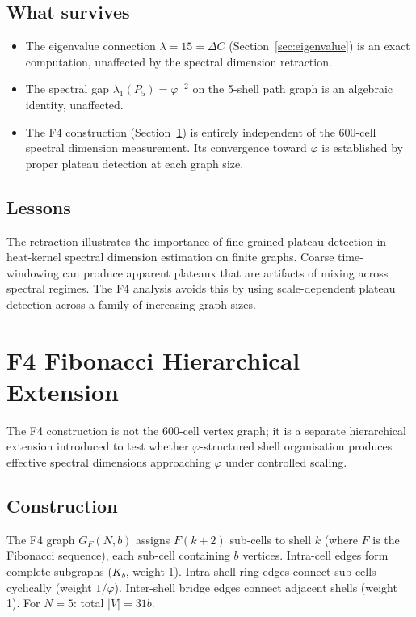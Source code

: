 \documentclass[12pt]{article}
\newcommand{\phig}{\varphi}
\begin{document}
\subsection{What survives}

\begin{itemize}
    \item The eigenvalue connection $\lambda = 15 = \Delta C$ (Section~\ref{sec:eigenvalue}) is an exact computation, unaffected by the spectral dimension retraction.
    \item The spectral gap $\lambda_1(P_5) = \phig^{-2}$ on the 5-shell path graph is an algebraic identity, unaffected.
    \item The F4 construction (Section~\ref{sec:F4}) is entirely independent of the 600-cell spectral dimension measurement. Its convergence toward $\phig$ is established by proper plateau detection at each graph size.
\end{itemize}

\subsection{Lessons}

The retraction illustrates the importance of fine-grained plateau detection in heat-kernel spectral dimension estimation on finite graphs. Coarse time-windowing can produce apparent plateaux that are artifacts of mixing across spectral regimes. The F4 analysis avoids this by using scale-dependent plateau detection across a family of increasing graph sizes.

\section{F4 Fibonacci Hierarchical Extension}\label{sec:F4}

The F4 construction is not the 600-cell vertex graph; it is a separate hierarchical extension introduced to test whether $\phig$-structured shell organisation produces effective spectral dimensions approaching $\phig$ under controlled scaling.

\subsection{Construction}

The F4 graph $G_F(N, b)$ assigns $F(k{+}2)$ sub-cells to shell $k$ (where $F$ is the Fibonacci sequence), each sub-cell containing $b$ vertices. Intra-cell edges form complete subgraphs ($K_b$, weight 1). Intra-shell ring edges connect sub-cells cyclically (weight $1/\phig$). Inter-shell bridge edges connect adjacent shells (weight 1). For $N = 5$: total $|V| = 31b$.
\end{document}
